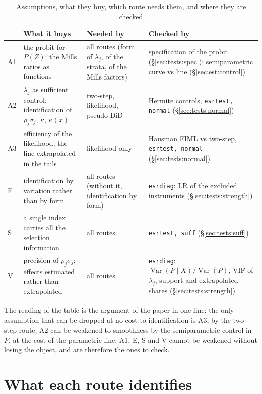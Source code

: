\documentclass[11pt,a4paper]{article}
\theoremstyle{plain}
\theoremstyle{definition}
\theoremstyle{remark}
\newcommand{\Var}{\operatorname{Var}}
\newcommand{\1}{\mathbf{1}}
\newcommand{\cmd}[1]{\texttt{#1}}
\newcommand{\kX}{\kappa(x)}
\begin{document}
\begin{table}[t]
\centering
\caption{Assumptions, what they buy, which route needs them, and where they are checked}
\label{tab:assump}
\small
\begin{tabular}{@{}lL{4.2cm}L{3.4cm}L{4.4cm}@{}}
\toprule
 & What it buys & Needed by & Checked by \\
\midrule
A1 & the probit for $P(Z)$; the Mills ratios as functions & all routes (form of $\lambda_j$, of the strata, of the Mills factors) & specification of the probit (\S\ref{sec:tests:spec}); semiparametric curve vs line (\S\ref{sec:est:control}) \\[2pt]
A2 & $\lambda_j$ as sufficient control; identification of $\rho_j\sigma_j$, $\kappa$, $\kX$ & two-step, likelihood, pseudo-DiD & Hermite controls, \cmd{esrtest, normal} (\S\ref{sec:tests:normal}) \\[2pt]
A3 & efficiency of the likelihood; the line extrapolated in the tails & likelihood only & Hausman FIML vs two-step, \cmd{esrtest, normal} (\S\ref{sec:tests:normal}) \\[2pt]
E  & identification by variation rather than by form & all routes (without it, identification by form) & \cmd{esrdiag}: LR of the excluded instruments (\S\ref{sec:tests:strength}) \\[2pt]
S  & a single index carries all the selection information & all routes & \cmd{esrtest, suff} (\S\ref{sec:tests:suff}) \\[2pt]
V  & precision of $\rho_j\sigma_j$; effects estimated rather than extrapolated & all routes & \cmd{esrdiag}: $\Var(P\mid X)/\Var(P)$, VIF of $\lambda_j$, support and extrapolated shares (\S\ref{sec:tests:strength}) \\
\bottomrule
\end{tabular}
\end{table}

The reading of the table is the argument of the paper in one line: the
only assumption that can be dropped at no cost to identification is A3,
by the two-step route; A2 can be weakened to smoothness by the
semiparametric control in $P$, at the cost of the parametric line; A1, E,
S and V cannot be weakened without losing the object, and are therefore
the ones to check.

\section{What each route identifies}\label{sec:ident}
\end{document}
